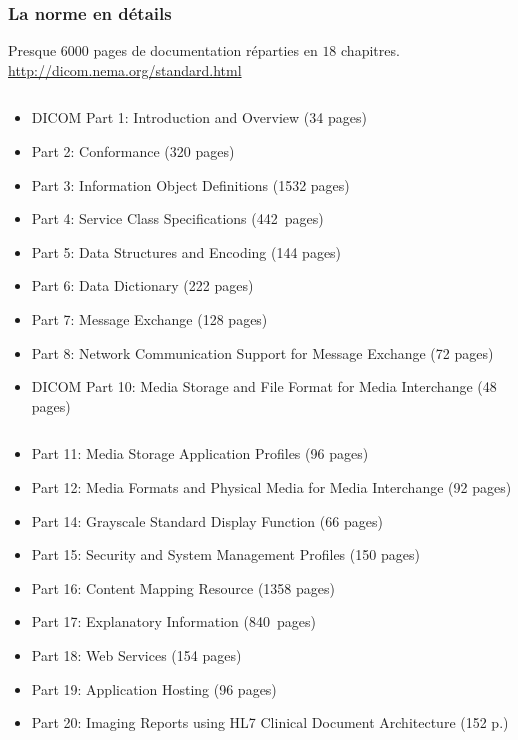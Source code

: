 	\frame
	{
		\frametitle{La norme en d\'etails}
		Presque $6000$ pages de documentation r\'eparties en $18$ chapitres.
		\url{http://dicom.nema.org/standard.html}		
		
		\begin{columns}\begin{scriptsize}
	  	\begin{column}[t]{0.5\linewidth}
			\begin{itemize}
				\item DICOM Part 1: Introduction and Overview (34 pages)
				\item Part 2: Conformance (320 pages)
				\item Part 3: Information Object Definitions (1532 pages)
				\item Part 4: Service Class Specifications (442~pages)
				\item Part 5: Data Structures and Encoding (144 pages)
				\item Part 6: Data Dictionary (222 pages)
				\item Part 7: Message Exchange (128 pages)
				\item Part 8: Network Communication Support for Message Exchange (72 pages)
				\item DICOM Part 10: Media Storage and File Format for Media Interchange (48 pages)
			\end{itemize}
	  	\end{column}
	  	\begin{column}[t]{0.5\linewidth}
			\begin{itemize}
				\item Part 11: Media Storage Application Profiles (96 pages)
				\item Part 12: Media Formats and Physical Media for Media Interchange (92 pages)
				\item Part 14: Grayscale Standard Display Function (66 pages)
				\item Part 15: Security and System Management Profiles (150 pages)
				\item Part 16: Content Mapping Resource (1358 pages)
				\item Part 17: Explanatory Information (840~pages)
				\item Part 18: Web Services (154 pages)
				\item Part 19: Application Hosting (96 pages)
				\item Part 20: Imaging Reports using HL7 Clinical Document Architecture (152 p.)
			\end{itemize}
	  	\end{column}\end{scriptsize}
	  	\end{columns}
	}

